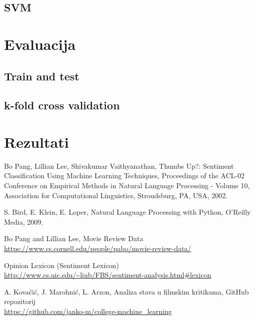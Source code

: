 \documentclass[conference]{IEEEtran}
\begin{document}
\subsection{SVM}

\section{Evaluacija}

\subsection{Train and test}

\subsection{k-fold cross validation}

\section{Rezultati}

\begin{thebibliography}{1}

	Bo Pang, Lillian Lee, Shivakumar Vaithyanathan,
 	Thumbs Up?: Sentiment Classification Using Machine Learning Techniques,
 	Proceedings of the ACL-02 Conference on Empirical Methods in Natural Language Processing - Volume 10,
 	Association for Computational Linguistics,
	Stroudsburg, PA, USA,
	2002.
	
	S. Bird, E. Klein, E. Loper,
	Natural Language Processing with Python,
	O'Reilly Media,
	2009.

	Bo Pang and Lillian Lee,
	Movie Review Data\\
	\url{https://www.cs.cornell.edu/people/pabo/movie-review-data/}
	
	Opinion Lexicon (Sentiment Lexicon)\\
	\url{http://www.cs.uic.edu/~liub/FBS/sentiment-analysis.html#lexicon}
	
	A. Kovačić, J. Marohnić, L. Arzon,
	Analiza stava u filmskim kritikama,
	GitHub repozitorij\\
	\url{https://github.com/janko-m/college-machine_learning}

\end{thebibliography}
\end{document}
